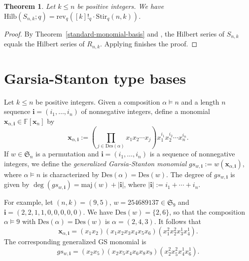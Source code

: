 \documentclass[10pt]{amsart}
\newtheorem{theorem}{Theorem}[section]
\theoremstyle{definition}
\newcommand{\maj}{{\mathrm {maj}}}
\newcommand{\Des}{{\mathrm {Des}}}
\newcommand{\Stir}{{\mathrm {Stir}}}
\newcommand{\Hilb}{{\mathrm {Hilb}}}
\newcommand{\rev}{{\mathrm {rev}}}
\newcommand{\symm}{{\mathfrak{S}}}
\newcommand{\FF}{{\mathbb{F}}}
\newcommand{\GS}{{\mathcal{GS}}}
\newcommand{\xx}{{\mathbf {x}}}
\newcommand{\ii}{{\mathbf{i}}}
\begin{document}
\begin{theorem}
\label{hilbert-series}
Let $k \leq n$ be positive integers.  We have
$\Hilb(S_{n,k};q) = \rev_q([k]!_q \cdot \Stir_q(n,k))$.
\end{theorem}

\begin{proof}
By Theorem~\ref{standard-monomial-basis} and \cite[Thm. 4.13]{HRS}, the Hilbert series of $S_{n,k}$ equals the Hilbert series of $R_{n,k}$. 
Applying \cite[Thm. 4.10]{HRS} finishes the proof.
\end{proof}






















\section{Garsia-Stanton type bases}
\label{Garsia}

Let $k \leq n$ be positive integers.
Given a composition $\alpha \models n$ and a length $n$ sequence $\ii = (i_1, \dots, i_n)$ 
of nonnegative integers, define a monomial $\xx_{\alpha,\ii} \in \FF[\xx_n]$ by
\begin{equation}
\xx_{\alpha,\ii} := \left( \prod_{j \in \Des(\alpha)} x_1 x_2 \cdots x_j \right) x_1^{i_1} x_2^{i_2} \cdots x_{n}^{i_{n}}.
\end{equation}
If $w \in \symm_n$ is a permutation and $\ii = (i_1, \dots, i_n)$ is a sequence of nonnegative integers, we 
define the \emph{generalized Garsia-Stanton monomial}
$gs_{w,\ii} := w(\xx_{\alpha,\ii})$, where $\alpha \models n$ is characterized by $\Des(\alpha) = \Des(w)$.
The degree of $gs_{w,\ii}$ is given by $\deg(gs_{w,\ii}) = \maj(w) + |\ii|$, where
$|\ii| := i_1 + \cdots  + i_n$.

For example, let $(n,k) = (9,5)$, $w = 254689137 \in \symm_9$ and $\ii = (2,2,1,1,0,0,0,0,0)$.  We have $\Des(w) = \{2,6\}$, so that the composition $\alpha \models 9$ with
$\Des(\alpha) = \Des(w)$ is $\alpha = (2,4,3)$.  It follows that
\begin{equation*}
\xx_{\alpha,\ii} = (x_1 x_2) (x_1 x_2 x_3 x_4 x_5 x_6) (x_1^2 x_2^2 x_3^1 x_4^1).
\end{equation*}
The corresponding generalized GS monomial is
\begin{equation*}
gs_{w,\ii} = (x_2 x_5) (x_2 x_5 x_4 x_6 x_8 x_9) (x_2^2 x_5^2 x_4^1 x_6^1).
\end{equation*}
\end{document}
